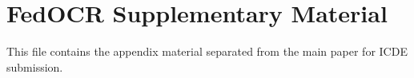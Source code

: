 \documentclass[conference]{IEEEtran}
\theoremstyle{definition}
\theoremstyle{remark}
\begin{document}
\section*{FedOCR Supplementary Material}
This file contains the appendix material separated from the main paper for ICDE submission.





\end{document}
